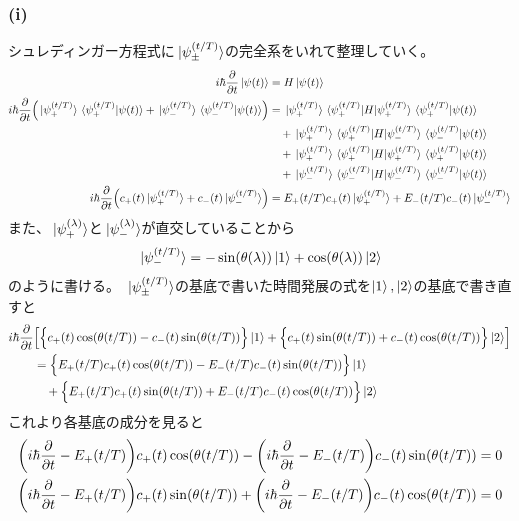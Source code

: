 \documentclass[../../sp_2017.tex]{subfiles}
\begin{document}
\subsubsection{(i)}
シュレディンガー方程式に\(\ket*{\psi_\pm^{(t/T)}}\)の完全系をいれて整理していく。
\begin{equation}\begin{aligned}[b]
    i\hbar\pdv{t}\ket*{\psi(t)}&=H\ket*{\psi(t)}\\
    i\hbar\pdv{t}\qty(\ket*{\psi_+^{(t/T)}}\braket*{\psi_+^{(t/T)}}{\psi(t)}
    +\ket*{\psi_-^{(t/T)}}\braket*{\psi_-^{(t/T)}}{\psi(t)})
    &=\ket*{\psi_+^{(t/T)}}\mel*{\psi_+^{(t/T)}}{H}{\psi_+^{(t/T)}}\braket*{\psi_+^{(t/T)}}{\psi(t)}\\
    &\quad+\ket*{\psi_+^{(t/T)}}\mel*{\psi_+^{(t/T)}}{H}{\psi_-^{(t/T)}}\braket*{\psi_-^{(t/T)}}{\psi(t)}\\
    &\quad+\ket*{\psi_+^{(t/T)}}\mel*{\psi_+^{(t/T)}}{H}{\psi_+^{(t/T)}}\braket*{\psi_+^{(t/T)}}{\psi(t)}\\
    &\quad+\ket*{\psi_-^{(t/T)}}\mel*{\psi_-^{(t/T)}}{H}{\psi_-^{(t/T)}}\braket*{\psi_-^{(t/T)}}{\psi(t)}\\
    i\hbar\pdv{t}\qty(c_+(t)\ket*{\psi_+^{(t/T)}}+c_-(t)\ket*{\psi_-^{(t/T)}})&=E_+(t/T)c_+(t)\ket*{\psi_+^{(t/T)}}+E_-(t/T)c_-(t)\ket*{\psi_-^{(t/T)}}\\
\end{aligned}\end{equation}
また、\(\ket*{\psi_+^{(\lambda)}}\)と\(\ket*{\psi_-^{(\lambda)}}\)が直交していることから
\begin{equation}\begin{aligned}[b]
    \ket*{\psi_-^{(t/T)}} = -\sin(\theta(\lambda))\ket{1}+\cos(\theta(\lambda))\ket{2}
\end{aligned}\end{equation}
のように書ける。
\(\ket*{\psi_\pm^{(t/T)}}\)の基底で書いた時間発展の式を\(\ket{1},\ket{2}\)の基底で書き直すと
\begin{equation}\begin{aligned}[b]
    i\hbar\pdv{t}&\Bigl[\Bigl\{c_+(t)\cos(\theta(t/T))-c_-(t)\sin(\theta(t/T))\Bigr\}\ket{1}
    +\Bigl\{c_+(t)\sin(\theta(t/T))+c_-(t)\cos(\theta(t/T))\Bigr\}\ket{2}\Bigr]\\
    &=\Bigl\{E_+(t/T)c_+(t)\cos(\theta(t/T))-E_-(t/T)c_-(t)\sin(\theta(t/T))\Bigr\}\ket{1}\\
    &\quad+\Bigl\{E_+(t/T)c_+(t)\sin(\theta(t/T))+E_-(t/T)c_-(t)\cos(\theta(t/T))\Bigr\}\ket{2}
\end{aligned}\end{equation}
これより各基底の成分を見ると
\begin{equation}\begin{aligned}[b]
    \qty(i\hbar\pdv{t}-E_+(t/T))c_+(t)\cos(\theta(t/T))
    -\qty(i\hbar\pdv{t}-E_-(t/T))c_-(t)\sin(\theta(t/T))&=0\\
    \qty(i\hbar\pdv{t}-E_+(t/T))c_+(t)\sin(\theta(t/T))
    +\qty(i\hbar\pdv{t}-E_-(t/T))c_-(t)\cos(\theta(t/T))&=0\\
\end{aligned}\end{equation}
\end{document}
